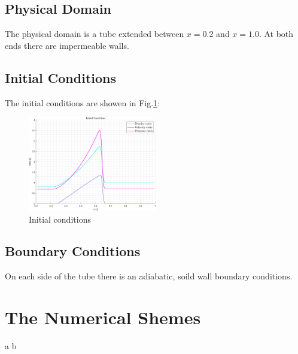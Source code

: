 \documentclass[11pt, a4paper]{article}
\begin{document}
\subsection{Physical Domain}
The physical domain is a tube extended between $x=0.2$ and $x=1.0$. At both ends there are impermeable walls.

\subsection{Initial Conditions}
The initial conditions are showen in Fig.\ref{fig: initial conditions}:
\begin{figure}[H]
    \centering
    \includegraphics[width=0.5\textwidth]{images/Initial Conditions.png}
    \caption{Initial conditions}
    \label{fig: initial conditions}
\end{figure}

\subsection{Boundary Conditions}
On each side of the tube there is an adiabatic, soild wall boundary conditions. 

\section{The Numerical Shemes}

\newpage
a
\newpage
b
\end{document}
